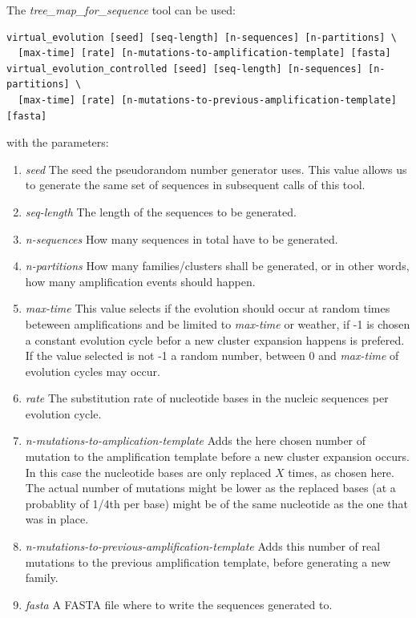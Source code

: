The \emph{tree\_map\_for\_sequence} tool can be used:
\begin{lstlisting}
virtual_evolution [seed] [seq-length] [n-sequences] [n-partitions] \
  [max-time] [rate] [n-mutations-to-amplification-template] [fasta]
virtual_evolution_controlled [seed] [seq-length] [n-sequences] [n-partitions] \
  [max-time] [rate] [n-mutations-to-previous-amplification-template] [fasta]
\end{lstlisting}
with the parameters:
\begin{enumerate}
  \item \emph{seed} The seed the pseudorandom number generator uses.
    This value allows us to generate the same set of sequences
    in subsequent calls of this tool.
  \item \emph{seq-length} The length of the sequences to be generated.
  \item \emph{n-sequences} How many sequences in total have to be
    generated.
  \item \emph{n-partitions} How many families/clusters shall be
    generated, or in other words, how many amplification events should happen.
  \item \emph{max-time} This value selects if the evolution should
    occur at random times beteween amplifications and be limited to
    \emph{max-time} or weather, if -1 is chosen 
    a constant evolution cycle befor a new cluster expansion
    happens is prefered. If the value selected is not -1  a random
    number, between 0 and \emph{max-time} of evolution cycles may occur.
  \item \emph{rate} The substitution rate of nucleotide
    bases in the nucleic sequences per evolution cycle.
  \item \emph{n-mutations-to-amplication-template} Adds the here
    chosen number of mutation to the amplification template before a
    new cluster expansion occurs.
    In this case the nucleotide bases are only replaced $X$
    times, as chosen here. The actual number of mutations
    might be lower as the replaced bases (at a probablity of 1/4th per
    base) might be of the same nucleotide as the one that was in place.
  \item \emph{n-mutations-to-previous-amplification-template} Adds
    this number of real mutations to the previous amplification
    template, before generating a new family.
  \item \emph{fasta} A FASTA file where to write the sequences
    generated to.
\end{enumerate}

